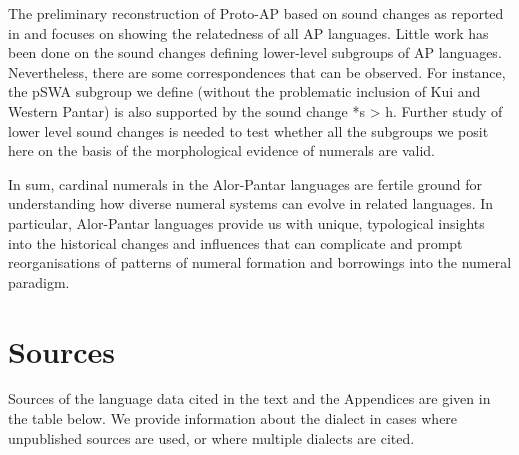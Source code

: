 The preliminary reconstruction of Proto-AP based on sound changes as reported in \citet{HoltonEtAl2012} and \citep{HoltonRobinsonTVhistory}focuses on showing the relatedness of all AP languages. Little work has been done on the sound changes defining lower-level subgroups of AP languages. Nevertheless, there are some correspondences that can be observed. For instance, the pSWA subgroup we define (without the problematic inclusion of Kui and Western Pantar) is also supported by the sound change *s {\textgreater} h. Further study of lower level sound changes is needed to test whether all the subgroups we posit here on the basis of the morphological evidence of numerals are valid. 

In sum, cardinal numerals in the Alor-Pantar languages are fertile ground for understanding how diverse numeral systems can evolve in related languages. In particular, Alor-Pantar languages provide us with unique, typological insights into the historical changes and influences that can complicate and prompt reorganisations of patterns of numeral formation and borrowings into the numeral paradigm.
 
\section{Sources} \label{sec:6:9}
Sources of the language data cited in the text and the Appendices are given in the table below. We provide information about the dialect in cases where unpublished sources are used, or where multiple dialects are cited. \vspace{.2cm}



